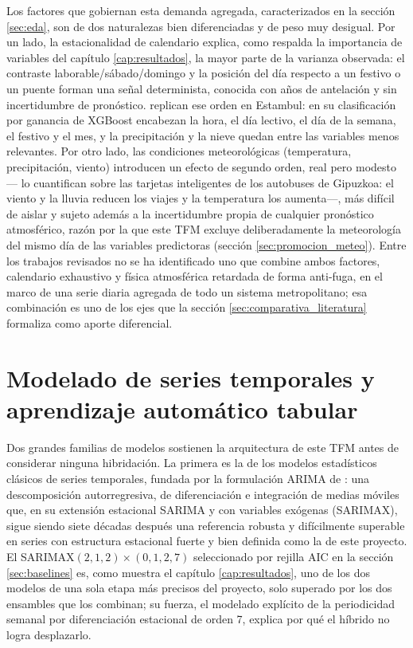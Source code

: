 Los factores que gobiernan esta demanda agregada, caracterizados en la sección
\ref{sec:eda}, son de dos naturalezas bien diferenciadas y de peso muy desigual. Por un
lado, la estacionalidad de calendario explica, como respalda la importancia de variables
del capítulo \ref{cap:resultados}, la mayor parte de la varianza observada: el contraste
laborable/sábado/domingo y la posición del día respecto a un festivo o un puente forman
una señal determinista, conocida con años de antelación y sin incertidumbre de
pronóstico. \textcite{yazicioglu2025passenger} replican ese orden
en Estambul: en su clasificación por ganancia de XGBoost encabezan la hora, el día lectivo, el
día de la semana, el festivo y el mes, y la precipitación y la nieve quedan entre las
variables menos relevantes. Por otro lado, las condiciones meteorológicas (temperatura, precipitación, viento)
introducen un efecto de segundo orden, real pero modesto —\textcite{arana2014weather} lo
cuantifican sobre las tarjetas inteligentes de los autobuses de Gipuzkoa: el viento y la
lluvia reducen los viajes y la temperatura los aumenta—, más difícil de aislar y sujeto
además a la incertidumbre propia de cualquier pronóstico atmosférico, razón por la que
este TFM excluye deliberadamente la meteorología del mismo día de las variables
predictoras (sección \ref{sec:promocion_meteo}).
Entre los trabajos revisados no se ha identificado uno que combine ambos factores,
calendario exhaustivo y física atmosférica retardada de forma anti-fuga, en el marco de
una serie diaria agregada de todo un sistema metropolitano; esa combinación es uno de los
ejes que la sección \ref{sec:comparativa_literatura} formaliza como aporte diferencial.

\section{Modelado de series temporales y aprendizaje automático tabular}\label{sec:modelado_series}

Dos grandes familias de modelos sostienen la arquitectura de este TFM antes de considerar
ninguna hibridación. La primera es la de los modelos estadísticos clásicos de series
temporales, fundada por la formulación ARIMA de \textcite{box1970time}: una descomposición
autorregresiva, de diferenciación e integración de medias móviles que, en su extensión
estacional SARIMA y con variables exógenas (SARIMAX), sigue siendo siete décadas después
una referencia robusta y difícilmente superable en series con estructura estacional fuerte
y bien definida como la de este proyecto. El SARIMAX$(2,1,2)\times(0,1,2,7)$ seleccionado
por rejilla AIC en la sección \ref{sec:baselines} es, como muestra el capítulo
\ref{cap:resultados}, uno de los dos modelos de una sola etapa más precisos del proyecto,
solo superado por los dos ensambles que los combinan; su fuerza, el modelado explícito de
la periodicidad semanal por diferenciación estacional de orden 7, explica por qué el
híbrido no logra desplazarlo.

